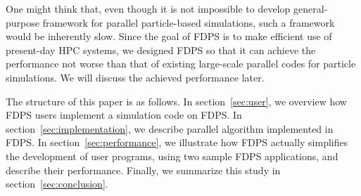 One might think that, even though it is not impossible to develop
general-purpose framework for parallel particle-based simulations,
such a framework would be inherently slow. Since the goal of FDPS is
to make efficient use of present-day HPC systems, we designed FDPS so
that it can achieve the performance not worse than that of existing
large-scale parallel codes for particle simulations. We will discuss
the achieved performance later.

The structure of this paper is as follows. In section~\ref{sec:user},
we overview how FDPS users implement a simulation code on FDPS.  In
section~\ref{sec:implementation}, we describe parallel algorithm
implemented in FDPS. In section~\ref{sec:performance}, we illustrate
how FDPS actually simplifies the development of user programs, using
two sample FDPS applications, and describe their performance. Finally,
we summarize this study in section~\ref{sec:conclusion}.
